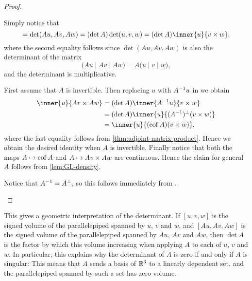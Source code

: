 \begin{proof}
\begin{proofsec*}
    \item[\itemref{enum:triple-product-transformation}]
    Simply notice that
    \begin{equation*}
        [Au, Av, Aw]
            = \det(Au, Av, Aw)
            = (\det A) \det(u,v,w)
            = (\det A) \inner{u}{v \crossp w},
    \end{equation*}
    where the second equality follows since $\det(Au, Av, Aw)$ is also the determinant of the matrix
    \begin{equation*}
        \bigl( Au \mid Av \mid Aw \bigr)
            = A \bigl( u \mid v \mid w \bigr),
    \end{equation*}
    and the determinant is multiplicative.

    \item[\itemref{enum:cross-product-transformation}]
    First assume that $A$ is invertible. Then replacing $u$ with $A^{-1} u$ in  we obtain
    \begin{align*}
        \inner{u}{Av \crossp Aw}
            &= (\det A) \inner{\inv{A} u}{v \crossp w} \\
            &= (\det A) \inner{u}{\trans{(\inv{A})} (v \crossp w)} \\
            &=  \inner{u}{(\cof A)(v \crossp w)},
    \end{align*}
    where the last equality follows from \cref{thm:adjoint-matrix-product}. Hence we obtain the desired identity when $A$ is invertible. Finally notice that both the maps $A \mapsto \operatorname{cof} A$ and $A \mapsto Av \times Aw$ are continuous. Hence the claim for general $A$ follows from \cref{lem:GL-density}.

    \item[\itemref{enum:cross-product-orthogonal-transformation}]
    Notice that $A^{-1} = A^\bot$, so this follows immediately from .
\end{proofsec*}
\end{proof}
%
This gives a geometric interpretation of the determinant. If $[u,v,w]$ is the signed volume of the parallelepiped spanned by $u$, $v$ and $w$, and $[Au,Av,Aw]$ is the signed volume of the parallelepiped spanned by $Au$, $Av$ and $Aw$, then $\det A$ is the factor by which this volume increasing when applying $A$ to each of $u$, $v$ and $w$. In particular, this explains why the determinant of $A$ is zero if and only if $A$ is singular: This means that $A$ sends a basis of $\mathbb{R}^3$ to a linearly dependent set, and the parallelepiped spanned by such a set has zero volume.


